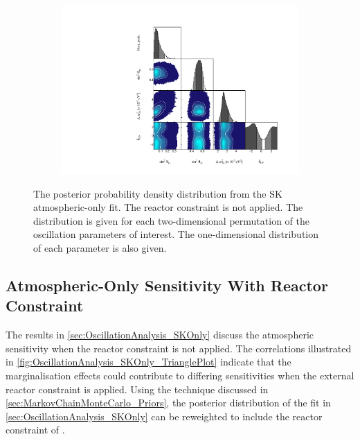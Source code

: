 \begin{figure}[h]
  \begin{subfigure}[t]{0.98\textwidth}
    \includegraphics[width=\textwidth, trim={0mm 0mm 0mm 0mm}, clip,page=1]{Figures/OA/SKOnlyFit/Contours_1D_woRC_UnSmeared_CredibleInterval_TrianglePlot.pdf}
  \end{subfigure}
  \caption{The posterior probability density distribution from the SK atmospheric-only fit. The reactor constraint is not applied. The distribution is given for each two-dimensional permutation of the oscillation parameters of interest. The one-dimensional distribution of each parameter is also given.}
  \label{fig:OscillationAnalysis_SKOnly_TrianglePlot}
\end{figure}

\clearpage
\subsection{Atmospheric-Only Sensitivity With Reactor Constraint}
\label{sec:OscillationAnalysis_SKOnly_wRC}

The results in \autoref{sec:OscillationAnalysis_SKOnly} discuss the atmospheric sensitivity when the reactor constraint is not applied. The correlations illustrated in \autoref{fig:OscillationAnalysis_SKOnly_TrianglePlot} indicate that the marginalisation effects could contribute to differing sensitivities when the external reactor constraint is applied. Using the technique discussed in \autoref{sec:MarkovChainMonteCarlo_Priors}, the posterior distribution of the fit in \autoref{sec:OscillationAnalysis_SKOnly} can be reweighted to include the reactor constraint of  \cite{Particle_Data_Group2020-ms}.


